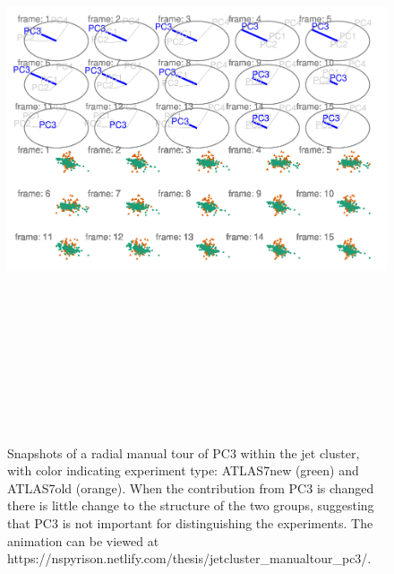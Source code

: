 \begin{Schunk}
\begin{figure}

{\centering \includegraphics[width=5.83in,height=7in]{spyrison-cook_files/figure-latex/JetClusterBad-1} 

}

\caption[Snapshots of a radial manual tour of PC3 within the jet cluster, with color indicating experiment type]{Snapshots of a radial manual tour of PC3 within the jet cluster, with color indicating experiment type: ATLAS7new (green) and ATLAS7old (orange).  When the contribution from PC3 is changed there is little change to the structure of the two groups, suggesting that PC3 is not important for distinguishing the experiments. The animation can be viewed at https://nspyrison.netlify.com/thesis/jetcluster\_manualtour\_pc3/.}\label{fig:JetClusterBad}
\end{figure}
\end{Schunk}

